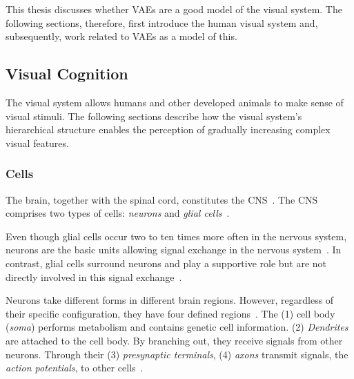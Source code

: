 This thesis discusses whether \acp{VAE} are a good model of the visual system.
The following sections, therefore, first introduce the human visual system and, subsequently, work related to \acp{VAE} as a model of this.

\subsection{Visual Cognition}\label{subsec:human-brain-structure}

The visual system allows humans and other developed animals to make sense of visual stimuli.
The following sections describe how the visual system's hierarchical structure enables the perception of gradually increasing complex visual features.

\subsubsection{Cells}

The brain, together with the spinal cord, constitutes the \ac{CNS}~\citep[p. 340]{mack2013principles}.
The \ac{CNS} comprises two types of cells: \textit{neurons} and \textit{glial cells}~\citep[p. 71]{mack2013principles}.

Even though glial cells occur two to ten times more often in the nervous system, neurons are the basic units allowing signal exchange in the nervous system~\citep[p. 24]{mack2013principles}.
In contrast, glial cells surround neurons and play a supportive role but are not directly involved in this signal exchange~\citep[p. 26]{mack2013principles}.

Neurons take different forms in different brain regions.
However, regardless of their specific configuration, they have four defined regions~\citep[p. 22]{mack2013principles}.
The (1) cell body (\textit{soma}) performs metabolism and contains genetic cell information.
(2) \textit{Dendrites} are attached to the cell body.
By branching out, they receive signals from other neurons.
Through their (3) \textit{presynaptic terminals}, (4) \textit{axons} transmit signals, the \textit{action potentials}, to other cells~\citep[pp. 22, 23]{mack2013principles}.

